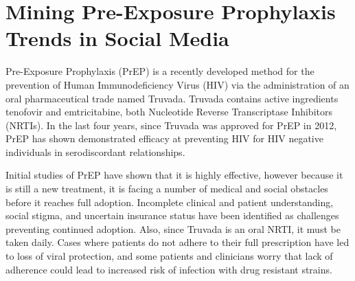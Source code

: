 


%



\section{Mining Pre-Exposure Prophylaxis Trends in Social Media}

Pre-Exposure Prophylaxis (PrEP) is a recently developed method for the prevention of Human Immunodeficiency Virus (HIV) via the administration of an oral pharmaceutical trade named Truvada. Truvada contains active ingredients tenofovir and emtricitabine, both Nucleotide Reverse Transcriptase Inhibitors (NRTIs). In the last four years, since Truvada was approved for PrEP in 2012, PrEP has shown demonstrated efficacy at preventing HIV for HIV negative individuals in serodiscordant relationships\cite{liu2014early}.

Initial studies of PrEP have shown that it is highly effective\cite{golub2013efficacy}, however because it is still a new treatment, it is facing a number of medical and social obstacles before it reaches full adoption. Incomplete clinical and patient understanding, social stigma, and uncertain insurance status have been identified as challenges preventing continued adoption\cite{calabrese2015stigma}. Also, since Truvada is an oral NRTI, it must be taken daily. Cases where patients do not adhere to their full prescription have led to loss of viral protection, and some patients and clinicians worry that lack of adherence could lead to increased risk of infection with drug resistant strains\cite{arnold2012qualitative}.

